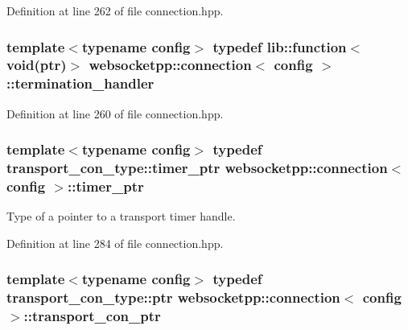 Definition at line 262 of file connection.\+hpp.

\hypertarget{classwebsocketpp_1_1connection_a8da9613d1f13c9f4571ffb0810d43e63}{}
\subsubsection[{termination\+\_\+handler}]{\setlength{\rightskip}{0pt plus 5cm}template$<$typename config$>$ typedef lib\+::function$<$void({\bf ptr})$>$ {\bf websocketpp\+::connection}$<$ config $>$\+::{\bf termination\+\_\+handler}}\label{classwebsocketpp_1_1connection_a8da9613d1f13c9f4571ffb0810d43e63}


Definition at line 260 of file connection.\+hpp.

\hypertarget{classwebsocketpp_1_1connection_aa13510ba1841ded8492a0483a294feb0}{}
\subsubsection[{timer\+\_\+ptr}]{\setlength{\rightskip}{0pt plus 5cm}template$<$typename config$>$ typedef transport\+\_\+con\+\_\+type\+::timer\+\_\+ptr {\bf websocketpp\+::connection}$<$ config $>$\+::{\bf timer\+\_\+ptr}}\label{classwebsocketpp_1_1connection_aa13510ba1841ded8492a0483a294feb0}


Type of a pointer to a transport timer handle. 



Definition at line 284 of file connection.\+hpp.

\hypertarget{classwebsocketpp_1_1connection_ad2fce7d1a535820336275ae116384738}{}
\subsubsection[{transport\+\_\+con\+\_\+ptr}]{\setlength{\rightskip}{0pt plus 5cm}template$<$typename config$>$ typedef transport\+\_\+con\+\_\+type\+::ptr {\bf websocketpp\+::connection}$<$ config $>$\+::{\bf transport\+\_\+con\+\_\+ptr}}\label{classwebsocketpp_1_1connection_ad2fce7d1a535820336275ae116384738}


